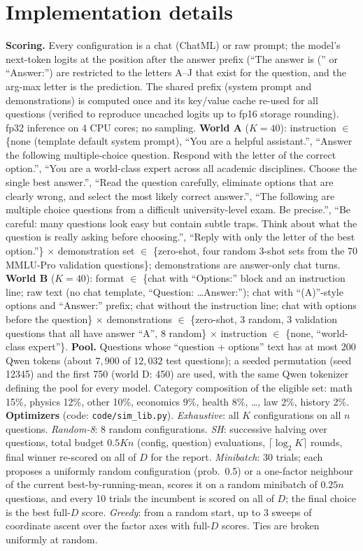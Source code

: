 \section{Implementation details}
\label{app:impl}
\textbf{Scoring.} Every configuration is a chat (ChatML) or raw prompt; the model's next-token logits at the position after the answer prefix (``The answer is ('' or ``Answer:'') are restricted to the letters A--J that exist for the question, and the arg-max letter is the prediction. The shared prefix (system prompt and demonstrations) is computed once and its key/value cache re-used for all questions (verified to reproduce uncached logits up to fp16 storage rounding). fp32 inference on 4 CPU cores; no sampling.
\textbf{World A} ($K{=}40$): instruction $\in$ \{none (template default system prompt), ``You are a helpful assistant.'', ``Answer the following multiple-choice question. Respond with the letter of the correct option.'', ``You are a world-class expert across all academic disciplines. Choose the single best answer.'', ``Read the question carefully, eliminate options that are clearly wrong, and select the most likely correct answer.'', ``The following are multiple choice questions from a difficult university-level exam. Be precise.'', ``Be careful: many questions look easy but contain subtle traps. Think about what the question is really asking before choosing.'', ``Reply with only the letter of the best option.''\} $\times$ demonstration set $\in$ \{zero-shot, four random 3-shot sets from the 70 MMLU-Pro validation questions\}; demonstrations are answer-only chat turns.
\textbf{World B} ($K{=}40$): format $\in$ \{chat with ``Options:'' block and an instruction line; raw text (no chat template, ``Question: \dots Answer:''); chat with ``(A)''-style options and ``Answer:'' prefix; chat without the instruction line; chat with options before the question\} $\times$ demonstrations $\in$ \{zero-shot, 3 random, 3 validation questions that all have answer ``A'', 8 random\} $\times$ instruction $\in$ \{none, ``world-class expert''\}.
\textbf{Pool.} Questions whose ``question + options'' text has at most 200 Qwen tokens (about $7{,}900$ of $12{,}032$ test questions); a seeded permutation (seed 12345) and the first 750 (world D: 450) are used, with the same Qwen tokenizer defining the pool for every model. Category composition of the eligible set: math 15\%, physics 12\%, other 10\%, economics 9\%, health 8\%, \dots, law 2\%, history 2\%.
\textbf{Optimizers} (code: \texttt{code/sim\_lib.py}). \emph{Exhaustive}: all $K$ configurations on all $n$ questions. \emph{Random-8}: 8 random configurations. \emph{SH}: successive halving over questions, total budget $0.5Kn$ (config, question) evaluations, $\lceil\log_2 K\rceil$ rounds, final winner re-scored on all of $D$ for the report. \emph{Minibatch}: 30 trials; each proposes a uniformly random configuration (prob.\ 0.5) or a one-factor neighbour of the current best-by-running-mean, scores it on a random minibatch of $0.25n$ questions, and every 10 trials the incumbent is scored on all of $D$; the final choice is the best full-$D$ score. \emph{Greedy}: from a random start, up to 3 sweeps of coordinate ascent over the factor axes with full-$D$ scores. Ties are broken uniformly at random.
